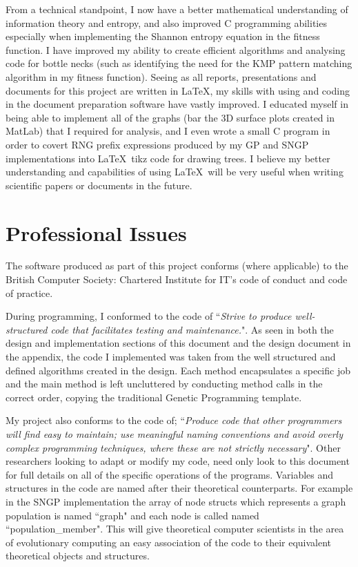 \documentclass[a4paper,10.5pt]{article}
\begin{document}
From a technical standpoint, I now have a better mathematical understanding of information theory and entropy, and also improved C programming abilities especially when implementing the Shannon entropy equation in the fitness function. I have improved my ability to create efficient algorithms and analysing code for bottle necks (such as identifying the need for the KMP pattern matching algorithm in my fitness function). Seeing as all reports, presentations and documents for this project are written in \LaTeX, my skills with using and coding in the document preparation software have vastly improved. I educated myself in being able to implement all of the graphs (bar the 3D surface plots created in MatLab) that I required for analysis, and I even wrote a small C program in order to covert RNG prefix expressions produced by my GP and SNGP implementations into \LaTeX\ tikz code for drawing trees. I believe my better understanding and capabilities of using  \LaTeX\ will be very useful when writing scientific papers or documents in the future.

\newpage
\section{Professional Issues}
The software produced as part of this project conforms (where applicable) to the British Computer Society: Chartered Institute for IT's code of conduct and code of practice.

During programming, I conformed to the code of ``\emph{Strive to produce well-structured code that facilitates testing and maintenance.}". As seen in both the design and implementation sections of this document and the design document in the appendix, the code I implemented was taken from the well structured and defined algorithms created in the design. Each method encapsulates a specific job and the main method is left uncluttered by conducting method calls in the correct order, copying the traditional Genetic Programming template.

My project also conforms to the code of; ``\emph{Produce code that other programmers will find easy to maintain; use meaningful naming conventions and avoid overly complex programming techniques, where these are not strictly necessary}". Other researchers looking to adapt or modify my code, need only look to this document for full details on all of the specific operations of the programs. Variables and structures in the code are named after their theoretical counterparts. For example in the SNGP implementation the array of node structs which represents a graph population is named ``graph" and each node is called named ``population\_member". This will give theoretical computer scientists in the area of evolutionary computing an easy association of the code to their equivalent theoretical objects and structures.
\end{document}
